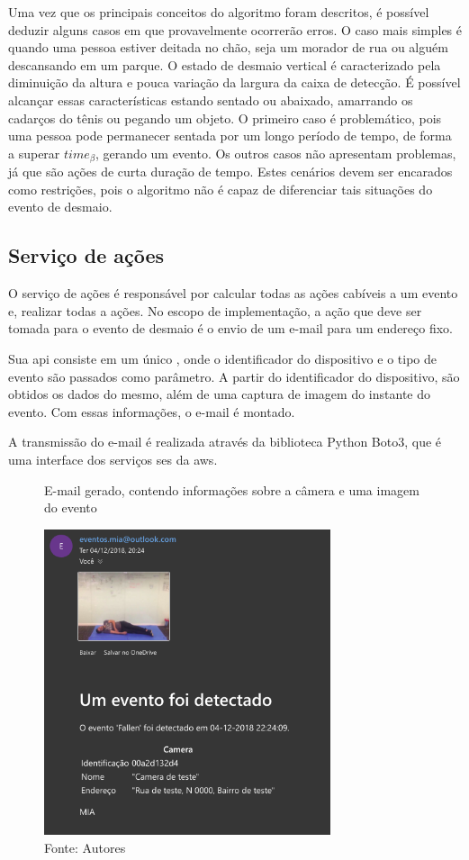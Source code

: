 \documentclass[]{politex}
\begin{document}
Uma vez que os principais conceitos do algoritmo foram descritos, é possível deduzir alguns casos em que provavelmente ocorrerão erros. O caso mais simples é quando uma pessoa estiver deitada no chão, seja um morador de rua ou alguém descansando em um parque. O estado de desmaio vertical é caracterizado pela diminuição da altura e pouca variação da largura da caixa de detecção. É possível alcançar essas características estando sentado ou abaixado, amarrando os cadarços do tênis ou pegando um objeto. O primeiro caso é problemático, pois uma pessoa pode permanecer sentada por um longo período de tempo, de forma a superar \(time_{\beta}\), gerando um evento. Os outros casos não apresentam problemas, já que são ações de curta duração de tempo. Estes cenários devem ser encarados como restrições, pois o algoritmo não é capaz de diferenciar tais situações do evento de desmaio.

\subsection{Serviço de ações}
O serviço de ações é responsável por calcular todas as ações cabíveis a um evento e, realizar todas a ações. No escopo de implementação, a ação que deve ser tomada para o evento de desmaio é o envio de um e-mail para um endereço fixo.

Sua \acrshort{api} consiste em um único , onde o identificador do dispositivo e o tipo de evento são passados como parâmetro. A partir do identificador do dispositivo, são obtidos os dados do mesmo, além de uma captura de imagem do instante do evento. Com essas informações, o e-mail é montado.

A transmissão do e-mail é realizada através da biblioteca Python Boto3, que é uma interface dos serviços \acrfull{ses} da \acrshort{aws}.

\begin{figure}[H]
    \centering
    \caption{E-mail gerado, contendo informações sobre a câmera e uma imagem do evento}
    \includegraphics[width=0.75\textwidth]{email_evento}
    \caption*{Fonte: Autores}
    \label{fig:jhonata_morrendo}
\end{figure}
\end{document}
